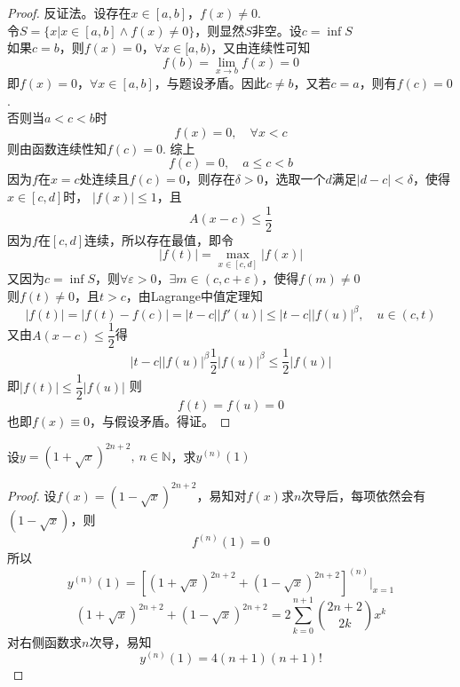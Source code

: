 \begin{proof}

    反证法。设存在$x \in [a,b]$，$f(x) \neq 0$. \\
    令$S = \{x | x \in [a,b] \land f(x) \neq 0\}$，则显然$S$非空。设$ c = \inf{S}$ \\
    如果$c = b$，则$f(x) = 0$，$\forall x \in [a,b)$，又由连续性可知
    $$f(b) = \lim\limits_{x \to b}{f(x)} = 0$$
    即$f(x) = 0$，$\forall x \in [a,b]$，与题设矛盾。因此$c \neq b$，又若$c = a$，则有$f(c) = 0$. \\
    否则当$a<c<b$时
    $$f(x) = 0, \quad \forall x < c$$
    则由函数连续性知$f(c) = 0$. 综上
    $$f(c) = 0, \quad a \leq c < b$$
    因为$f$在$x = c$处连续且$f(c) = 0$，则存在$\delta > 0$，选取一个$d$满足$|d - c| < \delta$，使得$x \in [c,d]$时，
    $|f(x)| \leq 1$，且
    $$A(x - c) \leq \dfrac{1}{2}$$
    因为$f$在$[c,d]$连续，所以存在最值，即令
    $$ |f(t)| = \max_{x\in[c,d]}{|f(x)|}$$
    又因为$c = \inf{S}$，则$\forall \varepsilon > 0$，$\exists m \in (c, c + \varepsilon)$，使得$f(m) \neq 0$ \\
    则$f(t) \neq 0$，且$t > c$，由\textup{Lagrange}中值定理知
    $$| f(t)| = |f(t) - f(c)| = |t - c||f'(u)| \leq |t - c||f(u)|^{\beta}, \quad u \in (c,t)$$
    又由$A(x - c) \leq \dfrac{1}{2}$得
    $$|t - c||f(u)|^{\beta} \dfrac{1}{2}|f(u)|^{\beta} \leq \dfrac{1}{2} |f(u)|$$
    即$|f(t)| \leq \dfrac{1}{2}|f(u)|$
    则
    $$f(t) = f(u) = 0$$
    也即$f(x) \equiv 0$，与假设矛盾。得证。

\end{proof}

\begin{proposition}
    
    设$y = (1 + \sqrt{x})^{2n + 2},\ n \in \mathbb{N}$，求$y^{(n)}(1)$

\end{proposition}

\begin{proof}

    设$f(x) = (1 - \sqrt{x})^{2n + 2}$，易知对$f(x)$求$n$次导后，每项依然会有$(1 - \sqrt{x})$，则
    $$f^{(n)}(1) = 0$$
    所以
    $$y^{(n)}(1) = \left[ (1 + \sqrt{x})^{2n + 2} + (1 - \sqrt{x})^{2n + 2} \right]^{(n)}\Big|_{x = 1}$$
    $$ (1 + \sqrt{x})^{2n + 2} + (1 - \sqrt{x})^{2n + 2} = 2 \sum\limits_{k = 0}^{n + 1}{\binom{2n + 2}{2k}x^k}$$
    对右侧函数求$n$次导，易知
    $$y^{(n)}(1) = 4(n + 1)(n + 1)!$$

\end{proof}

